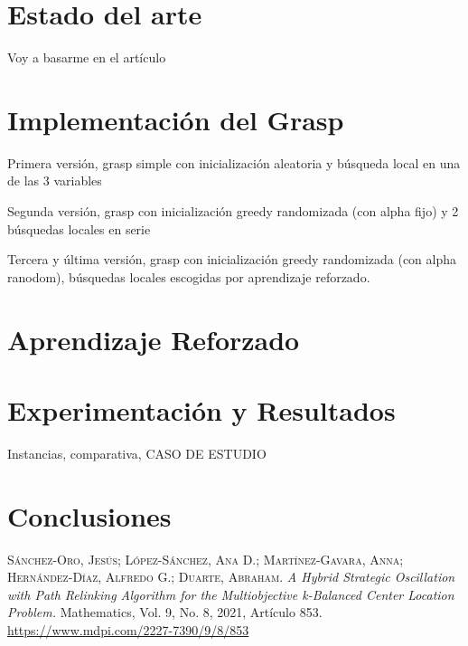 \documentclass[12pt,a4paper]{book}
\begin{document}
\chapter{Estado del arte}

Voy a basarme en el artículo \cite{k-Balanced}


\chapter{Implementación del Grasp}

Primera versión, grasp simple con inicialización aleatoria y búsqueda local en una de las 3 variables

Segunda versión, grasp con inicialización greedy randomizada (con alpha fijo) y 2 búsquedas locales en serie

Tercera y última versión, grasp con inicialización greedy randomizada (con alpha ranodom), búsquedas locales escogidas por aprendizaje reforzado.

\chapter{Aprendizaje Reforzado}

\chapter{Experimentación y Resultados}

Instancias, comparativa, CASO DE ESTUDIO

\chapter{Conclusiones}





\begin{thebibliography}{X}
     \textsc{Sánchez-Oro, Jesús; López-Sánchez, Ana D.; Martínez-Gavara, Anna; Hernández-Díaz, Alfredo G.; Duarte, Abraham}. \textit{A Hybrid Strategic Oscillation with Path Relinking Algorithm for the Multiobjective k-Balanced Center Location Problem.} Mathematics, Vol. 9, No. 8, 2021, Artículo 853. \url{https://www.mdpi.com/2227-7390/9/8/853}

\end{thebibliography}
\end{document}
